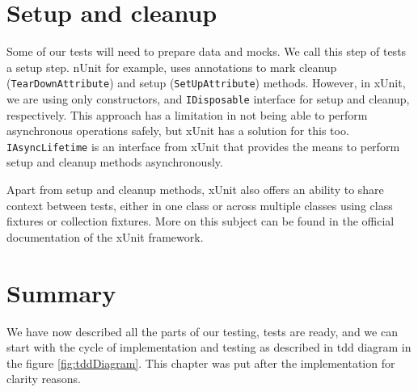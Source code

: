 \section {Setup and cleanup}

Some of our tests will need to prepare data and mocks.
We call this step of tests a setup step.
nUnit for example, uses annotations to mark cleanup (\texttt{TearDownAttribute}) and setup (\texttt{SetUpAttribute}) methods.
However, in xUnit, we are using only constructors, and \texttt{IDisposable} interface for setup and cleanup, respectively.
This approach has a limitation in not being able to perform asynchronous operations safely, but xUnit has a solution for this too.
\texttt{IAsyncLifetime} is an interface from xUnit that provides the means to perform setup and cleanup methods asynchronously.

Apart from setup and cleanup methods, xUnit also offers an ability to share context between tests, either in one class or across multiple classes using class fixtures or collection fixtures. More on this subject can be found in the official documentation of the xUnit framework. \cite{noauthor_home_nodate}

\section {Summary}

We have now described all the parts of our testing, tests are ready, and we can start with the cycle of implementation and testing as described in \acrshort{tdd} diagram in the figure \ref{fig:tddDiagram}.
This chapter was put after the implementation for clarity reasons.